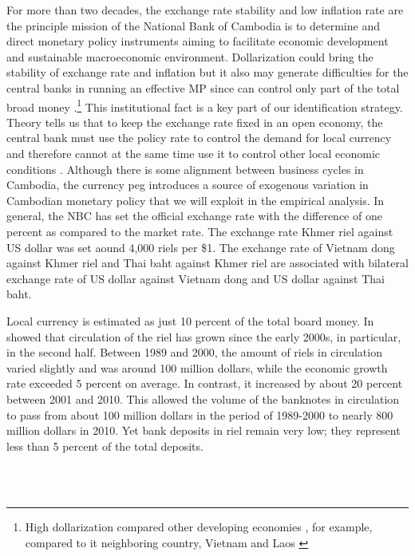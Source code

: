 \documentclass[11pt,letterpaper]{article}
\begin{document}
For more than two decades, the exchange rate stability and low inflation rate are the principle mission of the National Bank of Cambodia is to determine and direct monetary policy instruments aiming to facilitate economic development and sustainable macroeconomic environment. Dollarization could bring the stability of exchange rate and inflation but it also may generate difficulties for the central banks in running an effective MP since can control only part of the total broad money \cite{Mohsin1992}.\footnote{High dollarization compared other developing economies \cite{Ra2008}, for example, compared to it neighboring country, Vietnam and Laos \cite{Khou2013}} This institutional fact is a key part of our identification strategy. Theory tells us that to keep the exchange rate fixed in an open economy, the central bank must use the policy rate to control the demand for local currency and therefore cannot at the same time use it to control other local economic conditions \cite{Fleming1962, Mundell1963}. Although there is some alignment between business cycles in Cambodia, the currency peg introduces a source of exogenous variation in Cambodian monetary policy that we will exploit in the empirical analysis. In general, the NBC has set the official exchange rate with the difference of one percent as compared to the market rate. The exchange rate Khmer riel against US dollar was set aound 4,000 riels per \$1. The exchange rate of Vietnam dong against Khmer riel and Thai baht against Khmer riel are associated with bilateral exchange rate of US dollar against Vietnam dong and US dollar against Thai baht. 


Local currency is estimated as just 10 percent of the total board money. In \citet{Khou2013} showed that circulation of the riel has grown since the early 2000s, in particular, in the second half. Between 1989 and 2000, the amount of riels in circulation varied slightly and was around 100 million dollars, while the economic growth rate exceeded 5 percent on average. In contrast, it increased by about 20 percent between 2001 and 2010. This allowed the volume of the banknotes in circulation to pass from about 100 million dollars in the period of 1989-2000 to nearly 800 million dollars in 2010. Yet bank deposits in riel remain very low; they represent less than 5 percent of the total deposits. 

\\






\\
\end{document}

